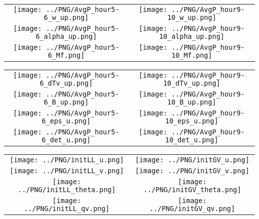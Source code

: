 \documentclass{article}
\begin{document}



\begin{table}
  \begin{tabular}{cc}
     \texttt{[image: ../PNG/AvgP\_hour5-6\_w\_up.png]}     & \texttt{[image: ../PNG/AvgP\_hour9-10\_w\_up.png]}     \\
     \texttt{[image: ../PNG/AvgP\_hour5-6\_alpha\_up.png]} & \texttt{[image: ../PNG/AvgP\_hour9-10\_alpha\_up.png]} \\
     \texttt{[image: ../PNG/AvgP\_hour5-6\_Mf.png]}       & \texttt{[image: ../PNG/AvgP\_hour9-10\_Mf.png]}
  \end{tabular}
\end{table}

\newpage

\begin{table}
  \begin{tabular}{cc}
     \texttt{[image: ../PNG/AvgP\_hour5-6\_dTv\_up.png]} & \texttt{[image: ../PNG/AvgP\_hour9-10\_dTv\_up.png]} \\
     \texttt{[image: ../PNG/AvgP\_hour5-6\_B\_up.png]}   & \texttt{[image: ../PNG/AvgP\_hour9-10\_B\_up.png]}   \\
     \texttt{[image: ../PNG/AvgP\_hour5-6\_eps\_u.png]}  & \texttt{[image: ../PNG/AvgP\_hour9-10\_eps\_u.png]}  \\
     \texttt{[image: ../PNG/AvgP\_hour5-6\_det\_u.png]}  & \texttt{[image: ../PNG/AvgP\_hour9-10\_det\_u.png]}
  \end{tabular}
\end{table}

\newpage

\begin{table}
  \begin{tabular}{cc}
     \texttt{[image: ../PNG/initLL\_u.png]}     & \texttt{[image: ../PNG/initGV\_u.png]}     \\
     \texttt{[image: ../PNG/initLL\_v.png]}     & \texttt{[image: ../PNG/initGV\_v.png]}     \\
     \texttt{[image: ../PNG/initLL\_theta.png]} & \texttt{[image: ../PNG/initGV\_theta.png]} \\
     \texttt{[image: ../PNG/initLL\_qv.png]}    & \texttt{[image: ../PNG/initGV\_qv.png]}
  \end{tabular}
\end{table}
\end{document}
